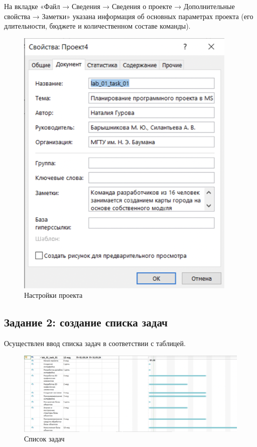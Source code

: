 На вкладке «Файл → Сведения → Сведения о проекте → Дополнительные
свойства → Заметки» указана информация об основных параметрах проекта
(его длительности, бюджете и количественном составе команды).

\begin{figure}[h!]
	\begin{center}
		\includegraphics[scale=0.7]{inc/img/p_9.png}
	\end{center}
	\captionsetup{justification=centering}
	\caption{Настройки проекта}
	\label{fig:u3}
\end{figure}

\subsection*{Задание 2: создание списка задач}

Осуществлен ввод списка задач в соответствии с таблицей. 

\begin{figure}[h!]
	\begin{center}
		\includegraphics[scale=0.33]{inc/img/p_10.png}
	\end{center}
	\captionsetup{justification=centering}
	\caption{Список задач}
	\label{fig:u3}
\end{figure}

